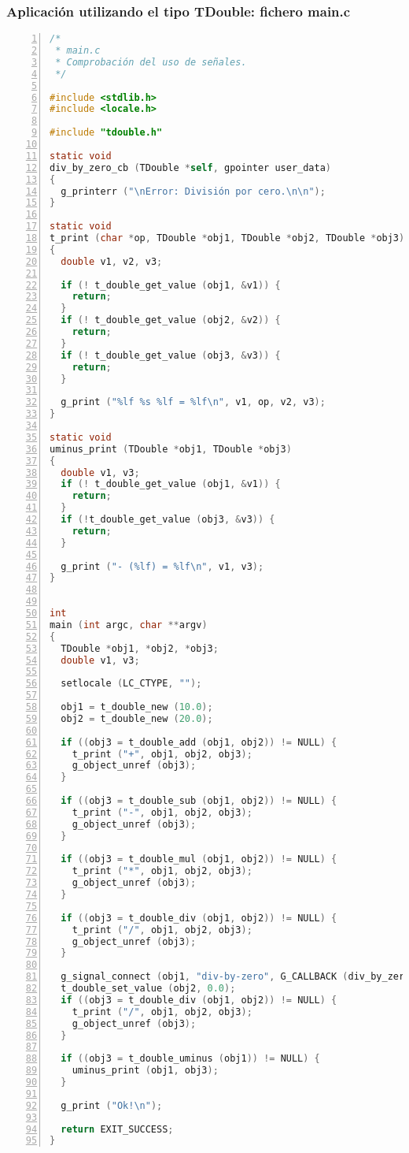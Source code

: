 \subsubsection{Aplicación utilizando el tipo \textsf{TDouble}: fichero \textsf{main.c}}
\begin{lstlisting}[language=C, numbers=left]
/*
 * main.c
 * Comprobación del uso de señales.
 */

#include <stdlib.h>
#include <locale.h>

#include "tdouble.h"

static void
div_by_zero_cb (TDouble *self, gpointer user_data)
{
  g_printerr ("\nError: División por cero.\n\n");
}

static void
t_print (char *op, TDouble *obj1, TDouble *obj2, TDouble *obj3)
{
  double v1, v2, v3;

  if (! t_double_get_value (obj1, &v1)) {
    return;
  }
  if (! t_double_get_value (obj2, &v2)) {
    return;
  }
  if (! t_double_get_value (obj3, &v3)) {
    return;
  }

  g_print ("%lf %s %lf = %lf\n", v1, op, v2, v3);
}

static void
uminus_print (TDouble *obj1, TDouble *obj3)
{
  double v1, v3;
  if (! t_double_get_value (obj1, &v1)) {
    return;
  }
  if (!t_double_get_value (obj3, &v3)) {
    return;
  }
  
  g_print ("- (%lf) = %lf\n", v1, v3); 
}


int
main (int argc, char **argv)
{
  TDouble *obj1, *obj2, *obj3;
  double v1, v3;

  setlocale (LC_CTYPE, "");

  obj1 = t_double_new (10.0);
  obj2 = t_double_new (20.0);

  if ((obj3 = t_double_add (obj1, obj2)) != NULL) {
    t_print ("+", obj1, obj2, obj3);
    g_object_unref (obj3);
  }

  if ((obj3 = t_double_sub (obj1, obj2)) != NULL) {
    t_print ("-", obj1, obj2, obj3);
    g_object_unref (obj3);
  }

  if ((obj3 = t_double_mul (obj1, obj2)) != NULL) {
    t_print ("*", obj1, obj2, obj3);
    g_object_unref (obj3);
  }
 
  if ((obj3 = t_double_div (obj1, obj2)) != NULL) {
    t_print ("/", obj1, obj2, obj3);
    g_object_unref (obj3);
  }

  g_signal_connect (obj1, "div-by-zero", G_CALLBACK (div_by_zero_cb), NULL);
  t_double_set_value (obj2, 0.0);
  if ((obj3 = t_double_div (obj1, obj2)) != NULL) {
    t_print ("/", obj1, obj2, obj3);
    g_object_unref (obj3);
  }

  if ((obj3 = t_double_uminus (obj1)) != NULL) {
    uminus_print (obj1, obj3);
  }

  g_print ("Ok!\n");

  return EXIT_SUCCESS;
}
\end{lstlisting}

